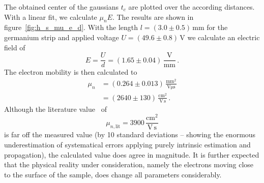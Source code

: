 The obtained center of the gaussians $t_c$ are plotted over the 
according distances. With a linear fit, we calculate $\mu_n E$. 
The results are shown in figure~\ref{fig:h_s_mu_e_d}. 
With the length $l = (3.0 \pm 0.5)\,$mm for the germanium strip and 
applied voltage $U = (49.6 \pm 0.8)\,$V we calculate an electric field of 
\begin{equation}
    E = \frac{U}{d} = (1.65 \pm 0.04)\, \mathrm{\frac{V}{mm}}\, .
\end{equation}
The electron mobility is then calculated to 
\begin{equation}
    \begin{split}
        \mu_n   &= (0.264 \pm 0.013)\, \mathrm{\frac{mm^2}{V\mu s}} \\
                &= (2640 \pm 130)\, \mathrm{\frac{cm^2}{V\,s}} \,.
    \end{split}
\end{equation}
Although the literature value~\cite{staatsexamen} of 
\begin{equation}
    \mu_{n, \mathrm{lit}} = 3900\, \mathrm{\frac{cm^2}{V\,s}}
\end{equation}
is far off the measured value (by 10 standard deviations --  showing the 
    enormous underestimation of systematical errors applying purely 
    intrinsic estimation and propagation), the calculated value 
does agree in magnitude. It is further expected that the physical 
reality under consideration, namely the electrons moving close to the surface 
of the sample, does change all parameters considerably. 


